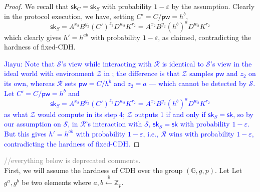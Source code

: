 \documentclass[12pt,a4paper]{article}
\newcommand{\simulator}{\mathcal{S}}
\newcommand{\env}{\mathcal{Z}}
\newcommand{\sk}{\mathsf{sk}}
\newcommand{\pw}{\mathsf{pw}}
\def\xjy#1{\textcolor{blue}{Jiayu: #1}}
\begin{document}
\begin{proof}
		We recall that $\sk_C=\sk_S$ with probability $1-\varepsilon$ by the assumption. Clearly in the protocol execution, we have, setting $C'=C/\pw=h^b$,
		$$\sk_S = A^{x_2}B^{y_2}(C')^{z_2}D^{w_2}K^{r_2}=A^{x_2}B^{y_2}(h^b)^{a}D^{w_2}K^{r_2}$$ which clearly gives $h' = h^{ab}$ with probability $1-\varepsilon$, as claimed, contradicting the hardness of fixed-CDH.

\xjy{Note that $\simulator$'s view while interacting with $\mathcal{R}$ is identical to $\simulator$'s view in the ideal world with environment $\env$ in \Cref{fig:adv}; the difference is that $\env$ samples $\pw$ and $z_2$ on its own, whereas $\mathcal{R}$ sets $\pw = C/h^b$ and $z_2 = a$ --- which cannot be detected by $\simulator$. Let $C' = C/\pw = h^b$ and
$$\sk_S = A^{x_2}B^{y_2}(C')^{z_2}D^{w_2}K^{r_2}=A^{x_2}B^{y_2}(h^b)^{a}D^{w_2}K^{r_2}$$
as what $\env$ would compute in its step 4; $\env$ outputs 1 if and only if $\sk_S = \sk$, so by our assumption on $\simulator$, in $\mathcal{R}$'s interaction with $\simulator$, $\sk_S = \sk$ with probability $1-\varepsilon$. But this gives $h' = h^{ab}$ with probability $1-\varepsilon$, i.e., $\mathcal{R}$ wins with probability $1-\varepsilon$, contradicting the hardness of fixed-CDH.}
		\end{proof}
	
	
	\textcolor{gray}{//everything below is deprecated comments.}\\

	
	First, we will assume the hardness of CDH over the group $(\mathbb{G},g,p)$. Let Let $g^a,g^b$ be two elements where $a,b\xleftarrow{\$}\mathbb{Z}_p$. 
	
\end{document}
